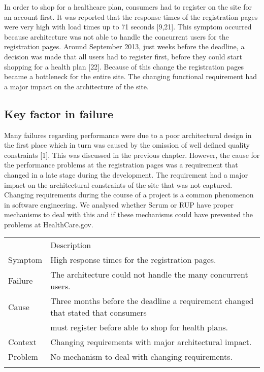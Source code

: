 \documentclass[]{article}
\begin{document}
In order to shop for a healthcare plan, consumers had to register on the
site for an account first. It was reported that the response times of
the registration pages were very high with load times up to 71 seconds
{[}9,21{]}. This symptom occurred because architecture was not able to
handle the concurrent users for the registration pages. Around September
2013, just weeks before the deadline, a decision was made that all users
had to register first, before they could start shopping for a health
plan {[}22{]}. Because of this change the registration pages became a
bottleneck for the entire site. The changing functional requirement had
a major impact on the architecture of the site.

\subsection{Key factor in failure}\label{key-factor-in-failure}

Many failures regarding performance were due to a poor architectural
design in the first place which in turn was caused by the omission of
well defined quality constraints {[}1{]}. This was discussed in the
previous chapter. However, the cause for the performance problems at the
registration pages was a requirement that changed in a late stage during
the development. The requirement had a major impact on the architectural
constraints of the site that was not captured. Changing requirements
during the course of a project is a common phenomenon in software
engineering. We analysed whether Scrum or RUP have proper mechanisms to
deal with this and if these mechanisms could have prevented the problems
at HealthCare.gov.

\begin{longtable}[c]{@{}ll@{}}
\toprule\addlinespace
& Description
\\\addlinespace
\midrule\endhead
Symptom & High response times for the registration pages.
\\\addlinespace
Failure & The architecture could not handle the many concurrent users.
\\\addlinespace
Cause & Three months before the deadline a requirement changed that
stated that consumers
\\\addlinespace
& must register before able to shop for health plans.
\\\addlinespace
Context & Changing requirements with major architectural impact.
\\\addlinespace
Problem & No mechanism to deal with changing requirements.
\\\addlinespace
\bottomrule
\end{longtable}
\end{document}
